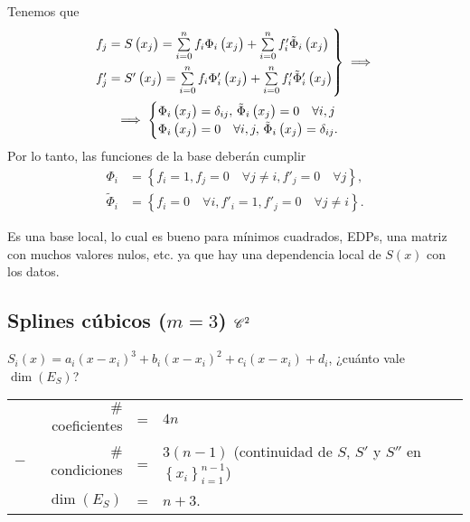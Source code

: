 Tenemos que
\begin{gather*}
    \begin{rcases}
        f_j = S\left( x_j \right) = \sum\limits_{i=0}^n f_i\Phi_i\left( x_j \right) + \sum\limits_{i=0}^n f'_i\tilde{\Phi}_i\left( x_j \right) \\
        f'_j = S'\left( x_j \right) = \sum\limits_{i=0}^n f_i\Phi'_i\left( x_j \right) + \sum\limits_{i=0}^n f'_i\tilde{\Phi}'_i\left( x_j \right)
    \end{rcases}
    \implies \\
    \implies
    \begin{cases}
        \Phi_i \left( x_j \right) = \delta_{ij},\, \tilde{\Phi}_i\left( x_j \right) = 0\quad \forall i,j\\
        \Phi_i \left( x_j \right) = 0\quad \forall i,j,\, \tilde{\Phi}_i\left( x_j \right) = \delta_{ij}.
    \end{cases}
\end{gather*}
Por lo tanto, las funciones de la base deberán cumplir
\begin{align*}
    \Phi_i &= \left\{ f_i = 1, f_j=0\quad \forall j\neq i, f'_j = 0 \quad\forall j \right\}, \\
    \tilde{\Phi}_i &= \left\{ f_i = 0\quad \forall i, f'_i = 1, f'_j = 0 \quad\forall j\neq i \right\}.
\end{align*}

\begin{obs}
    Es una base local, lo cual es bueno para mínimos cuadrados, EDPs, una matriz con muchos valores nulos, etc. ya que hay una dependencia local de $S\left( x \right)$ con los datos.
\end{obs}

\subsection{Splines cúbicos ($m=3$) $\mathscr{C}^2$}

$S_i\left( x \right) = a_i\left( x-x_i \right)^3 + b_i\left( x-x_i \right)^2 + c_i\left( x-x_i \right) + d_i$, ¿cuánto vale $\dim\left( E_S \right)$?

\begin{center}
    \begin{tabular}{crcl}
        & $\#$coeficientes &=& $4n$\\
        $-$ & $\#$condiciones &=& $3\left( n-1\right)$ (continuidad de $S$, $S'$ y $S''$ en $\left\{ x_i \right\}_{i=1}^{n-1}$)\\\hline
        &$\dim\left( E_S \right)$ &=& $n+3$.
    \end{tabular}
\end{center}

